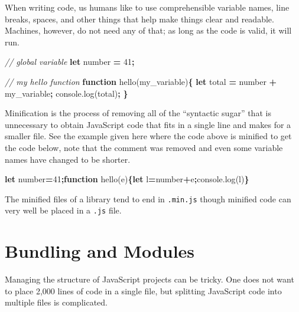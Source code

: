 \documentclass[10pt,]{krantz}
\makeatletter
\newenvironment{Shaded}{\begin{snugshade}}{\end{snugshade}}
\newcommand{\AttributeTok}[1]{\textcolor[rgb]{0.61,0.61,0.61}{#1}}
\newcommand{\CommentTok}[1]{\textcolor[rgb]{0.37,0.37,0.37}{\textit{#1}}}
\newcommand{\DecValTok}[1]{\textcolor[rgb]{0.06,0.06,0.06}{#1}}
\newcommand{\KeywordTok}[1]{\textcolor[rgb]{0.27,0.27,0.27}{\textbf{#1}}}
\newcommand{\NormalTok}[1]{#1}
\newcommand{\OperatorTok}[1]{\textcolor[rgb]{0.43,0.43,0.43}{\textbf{#1}}}
\newcommand{\VariableTok}[1]{\textcolor[rgb]{0,0,0}{#1}}
\newenvironment{kframe}{%
\medskip{}
\setlength{\fboxsep}{.8em}
 \def\at@end@of@kframe{}%
 \ifinner\ifhmode%
  \def\at@end@of@kframe{\end{minipage}}%
  \begin{minipage}{\columnwidth}%
 \fi\fi%
 \def\FrameCommand##1{\hskip\@totalleftmargin \hskip-\fboxsep
 \colorbox{shadecolor}{##1}\hskip-\fboxsep
     \hskip-\linewidth \hskip-\@totalleftmargin \hskip\columnwidth}%
 \MakeFramed {\advance\hsize-\width
   \@totalleftmargin\z@ \linewidth\hsize
   \@setminipage}}%
 {\par\unskip\endMakeFramed%
 \at@end@of@kframe}
\renewenvironment{Shaded}{\begin{kframe}}{\end{kframe}}
\makeatother
\begin{document}
When writing code, us humans like to use comprehensible variable names, line breaks, spaces, and other things that help make things clear and readable. Machines, however, do not need any of that; as long as the code is valid, it will run.

\begin{Shaded}
\begin{Highlighting}[]
\CommentTok{// global variable}
\KeywordTok{let}\NormalTok{ number }\OperatorTok{=} \DecValTok{41}\OperatorTok{;}

\CommentTok{// my hello function}
\KeywordTok{function} \AttributeTok{hello}\NormalTok{(my_variable)}\OperatorTok{\{}
    \KeywordTok{let}\NormalTok{ total }\OperatorTok{=}\NormalTok{ number }\OperatorTok{+}\NormalTok{ my_variable}\OperatorTok{;}
    \VariableTok{console}\NormalTok{.}\AttributeTok{log}\NormalTok{(total)}\OperatorTok{;}
\OperatorTok{\}}
\end{Highlighting}
\end{Shaded}

Minification is the process of removing all of the ``syntactic sugar'' that is unnecessary to obtain JavaScript code that fits in a single line and makes for a smaller file. See the example given here where the code above is minified to get the code below, note that the comment was removed and even some variable names have changed to be shorter.

\begin{Shaded}
\begin{Highlighting}[]
\KeywordTok{let}\NormalTok{ number}\OperatorTok{=}\DecValTok{41}\OperatorTok{;}\KeywordTok{function} \AttributeTok{hello}\NormalTok{(e)}\OperatorTok{\{}\KeywordTok{let}\NormalTok{ l}\OperatorTok{=}\NormalTok{number}\OperatorTok{+}\NormalTok{e}\OperatorTok{;}\VariableTok{console}\NormalTok{.}\AttributeTok{log}\NormalTok{(l)}\OperatorTok{\}}
\end{Highlighting}
\end{Shaded}

The minified files of a library tend to end in \texttt{.min.js} though minified code can very well be placed in a \texttt{.js} file.

\hypertarget{webpack-structure}{%
\section{Bundling and Modules}\label{webpack-structure}}

Managing the structure of JavaScript projects can be tricky. One does not want to place 2,000 lines of code in a single file, but splitting JavaScript code into multiple files is complicated.
\end{document}
